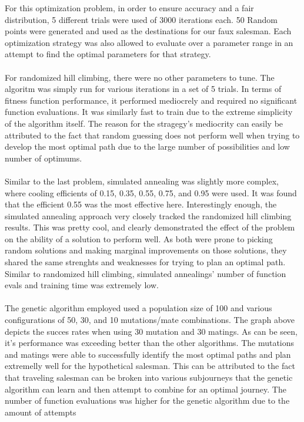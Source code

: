 \documentclass[h]{article}
\begin{document}
For this optimization problem, in order to ensure accuracy and a fair distribution, 5 different trials were 
used of 3000 iterations each.  50 Random points were generated and used as the destinations for our faux salesman.
Each optimization strategy was also allowed to evaluate over 
a parameter range in an attempt to find the optimal parameters for that 
strategy.
\\ \\
For randomized hill climbing, there were no other parameters to tune.  The 
algoritm was simply run for various iterations in a set of 5 
trials.  In terms of fitness function performance, it performed mediocrely and required no significant function evaluations. It was similarly fast to train due to the extreme simplicity 
of the algorithm itself.  The reason for the stragegy's mediocrity can easily be 
attributed to the fact that random guessing does not perform well when trying to 
develop the most optimal path due to the large number of possibilities and low 
number of optimums.
\\ \\
Similar to the last problem, simulated annealing was slightly more complex, where cooling efficients of 0.15, 
0.35, 0.55, 0.75, and 0.95 were used.  It was found that the efficient 0.55 was 
the most effective here.  Interestingly enough, the simulated annealing approach very closely tracked the randomized hill climbing results. 
 This was pretty cool, and clearly demonstrated the effect of the problem on the 
 ability of a solution to perform well.  As both were prone to picking random 
 solutions and making marginal improvements on those solutions, they shared the 
 same strenghts and weaknesses for trying to plan an optimal path.  Similar to randomized hill climbing, simulated annealings' number 
 of function evals and training time was extremely low.
\\ \\
The genetic algorithm employed used a population size of 100 and various 
configurations of 50, 30, and 10 mutations/mate combinations.  The graph above 
depicts the succes rates when using 30 mutation and 30 matings.  As can be seen, 
it's performance was exceeding better than the other algorithms.  The mutations and matings were able to successfully 
identify the most optimal paths and plan extremelly well for the hypothetical salesman.  This can be attributed to 
the fact that traveling salesman can be broken into various subjourneys that the 
genetic algorithm can learn and then attempt to combine for an optimal journey.  The number of function  evaluations was higher for the genetic algorithm due to the amount of attempts 
\end{document}
